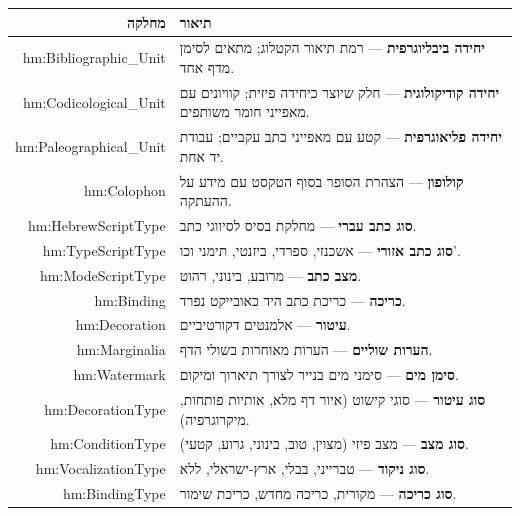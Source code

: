 \begin{longtable}{|r|p{10cm}|}
\hline
\textbf{מחלקה} & \textbf{תיאור} \\
\hline
\endhead

hm:Bibliographic\_Unit & 
\textbf{יחידה ביבליוגרפית} — רמת תיאור הקטלוג; מתאים לסימן מדף אחד.\\
\hline

hm:Codicological\_Unit & 
\textbf{יחידה קודיקולוגית} — חלק שיוצר כיחידה פיזית; קוויונים עם מאפייני חומר משותפים.\\
\hline

hm:Paleographical\_Unit & 
\textbf{יחידה פליאוגרפית} — קטע עם מאפייני כתב עקביים; עבודת יד אחת.\\
\hline

hm:Colophon & 
\textbf{קולופון} — הצהרת הסופר בסוף הטקסט עם מידע על ההעתקה.\\
\hline

hm:HebrewScriptType & 
\textbf{סוג כתב עברי} — מחלקת בסיס לסיווגי כתב.\\
\hline

hm:TypeScriptType & 
\textbf{סוג כתב אזורי} — אשכנזי, ספרדי, ביזנטי, תימני וכו'.\\
\hline

hm:ModeScriptType & 
\textbf{מצב כתב} — מרובע, בינוני, רהוט.\\
\hline

hm:Binding & 
\textbf{כריכה} — כריכת כתב היד כאובייקט נפרד.\\
\hline

hm:Decoration & 
\textbf{עיטור} — אלמנטים דקורטיביים.\\
\hline

hm:Marginalia & 
\textbf{הערות שוליים} — הערות מאוחרות בשולי הדף.\\
\hline

hm:Watermark & 
\textbf{סימן מים} — סימני מים בנייר לצורך תיארוך ומיקום.\\
\hline

hm:DecorationType & 
\textbf{סוג עיטור} — סוגי קישוט (איור דף מלא, אותיות פותחות, מיקרוגרפיה).\\
\hline

hm:ConditionType & 
\textbf{סוג מצב} — מצב פיזי (מצוין, טוב, בינוני, גרוע, קטעי).\\
\hline

hm:VocalizationType & 
\textbf{סוג ניקוד} — טברייני, בבלי, ארץ-ישראלי, ללא.\\
\hline

hm:BindingType & 
\textbf{סוג כריכה} — מקורית, כריכה מחדש, כריכת שימור.\\
\hline


\end{longtable}
